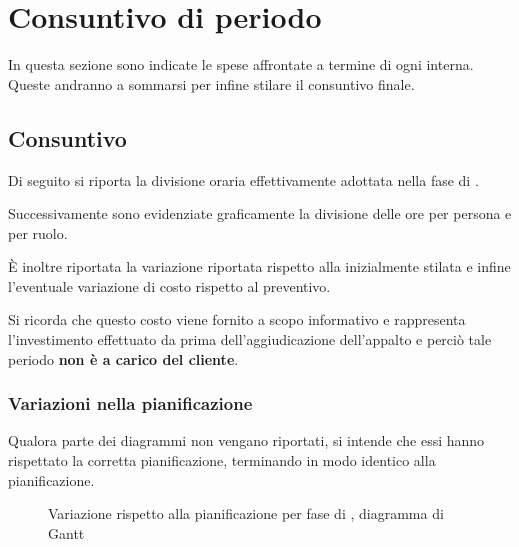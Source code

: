 \pagebreak
\section{Consuntivo di periodo} \label{sec:consuntivo}
In questa sezione sono indicate le spese affrontate a termine di ogni  interna. Queste andranno a sommarsi per infine stilare il consuntivo finale.



\newcommand{\introconsuntivo}[1]
{
Di seguito si riporta la divisione oraria effettivamente adottata nella fase di #1.

Successivamente sono evidenziate graficamente la divisione delle ore per persona e per ruolo. 

È inoltre riportata la variazione riportata rispetto alla \gloss{baseline} inizialmente stilata e infine l'eventuale variazione di costo rispetto al preventivo.
}

\subsection{Consuntivo \AR}
\introconsuntivo{\AR}

Si ricorda che questo costo viene fornito a scopo informativo e rappresenta l'investimento effettuato da {\hx} prima dell'aggiudicazione dell'appalto e perciò tale periodo \textbf{non è a carico del cliente}. 

\subsubsection{Variazioni nella pianificazione}

Qualora parte dei diagrammi non vengano riportati, si intende che essi hanno rispettato la corretta pianificazione, terminando in modo identico alla pianificazione.

\begin{figure}[H]
\label{tab:cgen1}

  \caption{Variazione rispetto alla pianificazione per fase di \AR, diagramma di Gantt}
\end{figure}

